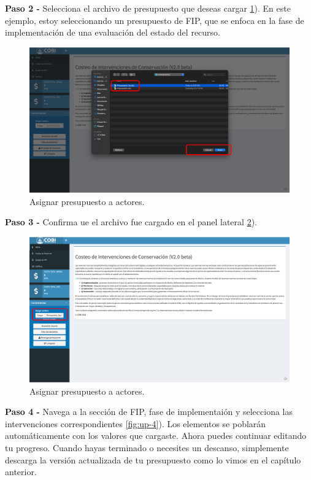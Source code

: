 \documentclass[
]{book}
\begin{document}
\textbf{Paso 2 - } Selecciona el archivo de presupuesto que deseas cargar \ref{fig:up-2}). En este ejemplo, estoy seleccionando un presupuesto de FIP, que se enfoca en la fase de implementación de una evaluación del estado del recurso.

\begin{figure}
\includegraphics[width=61.11in]{images/up-2} \caption{Asignar presupuesto a actores.}\label{fig:up-2}
\end{figure}

\textbf{Paso 3 - } Confirma ue el archivo fue cargado en el panel lateral \ref{fig:up-3}).

\begin{figure}
\includegraphics[width=61.11in]{images/up-3} \caption{Asignar presupuesto a actores.}\label{fig:up-3}
\end{figure}

\textbf{Paso 4 - } Navega a la sección de FIP, fase de implementaión y selecciona las intervenciones correspondientes \ref{fig:up-4}). Los elementos se poblarán automáticamente con los valores que cargaste. Ahora puedes continuar editando tu progreso. Cuando hayas terminado o necesites un descanso, simplemente descarga la versión actualizada de tu presupuesto como lo vimos en el capítulo anterior.
\end{document}
